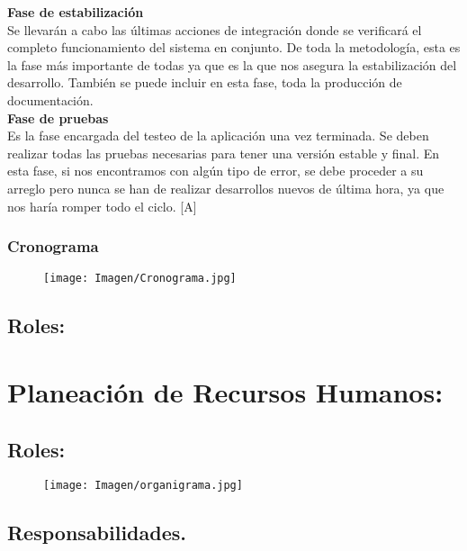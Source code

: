 \documentclass[10pt]{article}
\begin{document}
\textbf{Fase de estabilización} \\

Se llevarán a cabo las últimas acciones de integración donde se verificará el completo funcionamiento del sistema en conjunto. De toda la metodología, esta es la fase más importante de todas ya que es la que nos asegura la estabilización del desarrollo. También se puede incluir en esta fase, toda la producción de documentación. \\

\textbf{Fase de pruebas} \\

Es la fase encargada del testeo de la aplicación una vez terminada. Se deben realizar todas las pruebas necesarias para tener una versión estable y final. En esta fase, si nos encontramos con algún tipo de error, se debe proceder a su arreglo pero nunca se han de realizar desarrollos nuevos de última hora, ya que nos haría romper todo el ciclo. [A] \\
\newpage 

\subsubsection{Cronograma}
\begin{figure}[htbp!]
	\begin{center}
		\texttt{[image: Imagen/Cronograma.jpg]}
	\end{center}
\end{figure}

\newpage 

\subsection{Roles:}
\section{Planeación de Recursos Humanos:}

\subsection{Roles:}
\begin{figure}[htbp!]
	\begin{center}
		\texttt{[image: Imagen/organigrama.jpg]}
	\end{center}
\end{figure}
\newpage 
\subsection{Responsabilidades.}
\end{document}

